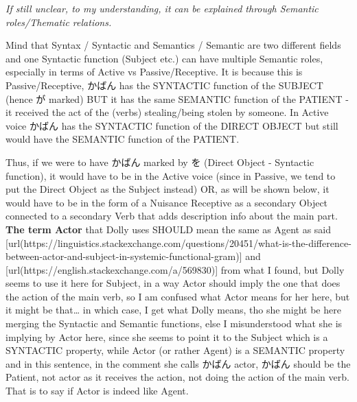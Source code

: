 {\em If still unclear, to my understanding, it can be explained through Semantic roles/Thematic relations.}

Mind that Syntax / Syntactic and Semantics / Semantic are two different fields and one Syntactic function (Subject etc.) can have multiple Semantic roles, especially in terms of Active vs Passive/Receptive.\crlf
It is because this is Passive/Receptive, かばん has the SYNTACTIC function of the SUBJECT (hence が marked) BUT it has the same SEMANTIC function of the PATIENT - it received the act of the (verbs) stealing/being stolen by someone. In Active voice かばん has the SYNTACTIC function of the DIRECT OBJECT but still would have the SEMANTIC function of the PATIENT.

Thus, if we were to have かばん marked by を (Direct Object - Syntactic function), it would have to be in the Active voice (since in Passive, we tend to put the Direct Object as the Subject instead) OR, as will be shown below, it would have to be in the form of a Nuisance Receptive as a secondary Object connected to a secondary Verb that adds description info about the main part.\crlf
{\bf The term Actor} that Dolly uses SHOULD mean the same as Agent as said [url(https://linguistics.stackexchange.com/questions/20451/what-is-the-difference-between-actor-and-subject-in-systemic-functional-gram)] and [url(https://english.stackexchange.com/a/569830)] from what I found, but Dolly seems to use it here for Subject, in a way Actor should imply the one that does the action of the main verb, so I am confused what Actor means for her here, but it might be that\ldots{} in which case, I get what Dolly means, tho she might be here merging the Syntactic and Semantic functions, else I misunderstood what she is implying by Actor here, since she seems to point it to the Subject which is a SYNTACTIC property, while Actor (or rather Agent) is a SEMANTIC property and in this sentence, in the comment she calls かばん actor, かばん should be the Patient, not actor as it receives the action, not doing the action of the main verb. That is to say if Actor is indeed like Agent.

